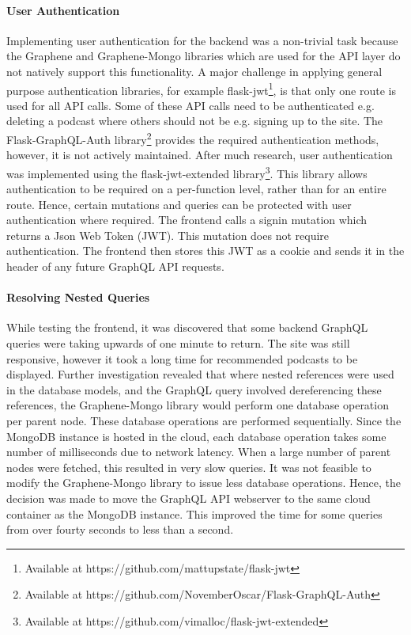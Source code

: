 \documentclass[../report.tex]{subfiles}
\begin{document}
\paragraph{User Authentication}

Implementing user authentication for the backend was a non-trivial task because the Graphene and Graphene-Mongo libraries which are used for the API layer do not natively support this functionality.
A major challenge in applying general purpose authentication libraries, for example flask-jwt\footnote{Available at https://github.com/mattupstate/flask-jwt}, is that only one route is used for all API calls.
Some of these API calls need to be authenticated e.g. deleting a podcast where others should not be e.g. signing up to the site.
The Flask-GraphQL-Auth library\footnote{Available at https://github.com/NovemberOscar/Flask-GraphQL-Auth} provides the required authentication methods, however, it is not actively maintained.
After much research, user authentication was implemented using the flask-jwt-extended library\footnote{Available at https://github.com/vimalloc/flask-jwt-extended}.
This library allows authentication to be required on a per-function level, rather than for an entire route.
Hence, certain mutations and queries can be protected with user authentication where required.
The frontend calls a signin mutation which returns a Json Web Token (JWT).
This mutation does not require authentication.
The frontend then stores this JWT as a cookie and sends it in the header of any future GraphQL API requests.

\paragraph{Resolving Nested Queries}

While testing the frontend, it was discovered that some backend GraphQL queries were taking upwards of one minute to return.
The site was still responsive, however it took a long time for recommended podcasts to be displayed.
Further investigation revealed that where nested references were used in the database models, and the GraphQL query involved dereferencing these references, the Graphene-Mongo library would perform one database operation per parent node.
These database operations are performed sequentially.
Since the MongoDB instance is hosted in the cloud, each database operation takes some number of milliseconds due to network latency.
When a large number of parent nodes were fetched, this resulted in very slow queries.
It was not feasible to modify the Graphene-Mongo library to issue less database operations.
Hence, the decision was made to move the GraphQL API webserver to the same cloud container as the MongoDB instance.
This improved the time for some queries from over fourty seconds to less than a second.
\end{document}

